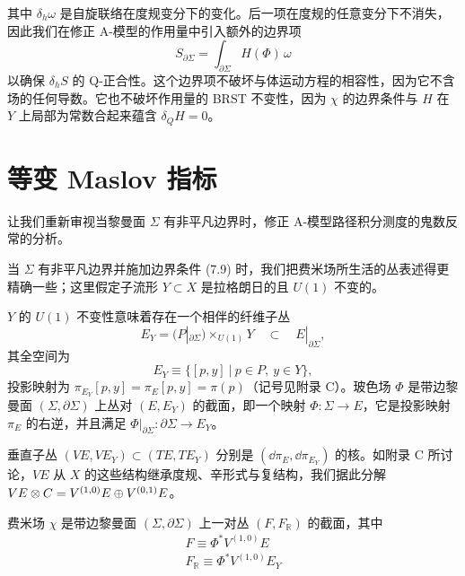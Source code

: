 其中 $\delta_h\omega$ 是自旋联络在度规变分下的变化。后一项在度规的任意变分下不消失，因此我们在修正 A-模型的作用量中引入额外的边界项
\[
S_{\partial\Sigma}=\int_{\partial\Sigma}H(\Phi)\,\omega
\]
以确保 $\delta_hS$ 的 Q-正合性。这个边界项不破坏与体运动方程的相容性，因为它不含场的任何导数。它也不破坏作用量的 BRST 不变性，因为 $\chi$ 的边界条件与 $H$ 在 $Y$ 上局部为常数合起来蕴含 $\delta_QH=0$。


\section{等变 Maslov 指标}

让我们重新审视当黎曼面 $\Sigma$ 有非平凡边界时，修正 A-模型路径积分测度的鬼数反常的分析。


当 $\Sigma$ 有非平凡边界并施加边界条件 (7.9) 时，我们把费米场所生活的丛表述得更精确一些；这里假定子流形 $Y\subset X$ 是拉格朗日的且 $U(1)$ 不变的。

$Y$ 的 $U(1)$ 不变性意味着存在一个相伴的纤维子丛
\[
E_Y=(P|_{\partial\Sigma})\times_{U(1)}Y\quad\subset\quad E|_{\partial\Sigma},
\]
其全空间为
\[
E_Y\equiv\big\{[p,y]\ \big|\ p\in P,\ y\in Y\big\},
\]
投影映射为 $\pi_{E_Y}[p,y]=\pi_E[p,y]=\pi(p)$（记号见附录 C）。玻色场 $\Phi$ 是带边黎曼面 $(\Sigma,\partial\Sigma)$ 上丛对 $(E,E_Y)$ 的截面，即一个映射 $\Phi:\Sigma\to E$，它是投影映射 $\pi_E$ 的右逆，并且满足 $\Phi|_{\partial\Sigma}:\partial\Sigma\to E_Y$。

垂直子丛 $(VE,VE_Y)\subset(TE,TE_Y)$ 分别是 $(\dd\pi_E,\dd\pi_{E_Y})$ 的核。如附录 C 所讨论，$VE$ 从 $X$ 的这些结构继承度规、辛形式与复结构，我们据此分解 $VE\otimes C=V^{(1,0)}E\oplus V^{(0,1)}E$。

费米场 $\chi$ 是带边黎曼面 $(\Sigma,\partial\Sigma)$ 上一对丛 $(F,F_{\mathbb R})$ 的截面，其中
\begin{gather*}
F\equiv\Phi^*V^{(1,0)}E\\
F_{\mathbb R}\equiv\Phi^*V^{(1,0)}E_Y
\end{gather*}


